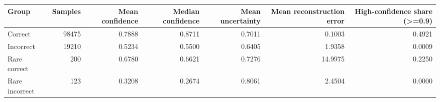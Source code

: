 \begin{tabular}{lrrrrrr}
\toprule
Group & Samples & Mean confidence & Median confidence & Mean uncertainty & Mean reconstruction error & High-confidence share (>=0.9) \\
\midrule
Correct & 98475 & 0.7888 & 0.8711 & 0.7011 & 0.1003 & 0.4921 \\
Incorrect & 19210 & 0.5234 & 0.5500 & 0.6405 & 1.9358 & 0.0009 \\
Rare correct & 200 & 0.6780 & 0.6621 & 0.7276 & 14.9975 & 0.2250 \\
Rare incorrect & 123 & 0.3208 & 0.2674 & 0.8061 & 2.4504 & 0.0000 \\
\bottomrule
\end{tabular}
